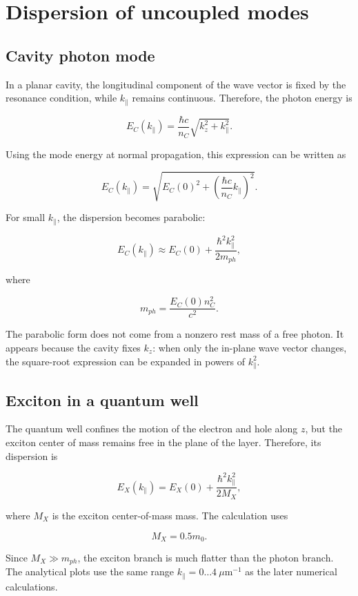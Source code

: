 \documentclass[12pt,a4paper]{article}
\begin{document}
\clearpage
\section{Dispersion of uncoupled modes}

\subsection{Cavity photon mode}

In a planar cavity, the longitudinal component of the wave vector is fixed by the resonance condition, while $k_\parallel$ remains continuous. Therefore, the photon energy is

\[
E_C(k_\parallel)
=
\frac{\hbar c}{n_C}
\sqrt{k_z^2+k_\parallel^2}.
\]

Using the mode energy at normal propagation, this expression can be written as

\[
E_C(k_\parallel)
=
\sqrt{
E_C(0)^2+
\left(\frac{\hbar c}{n_C}k_\parallel\right)^2
}.
\]

For small $k_\parallel$, the dispersion becomes parabolic:

\[
E_C(k_\parallel)
\approx
E_C(0)+\frac{\hbar^2k_\parallel^2}{2m_{ph}},
\]

where

\[
m_{ph}=\frac{E_C(0)n_C^2}{c^2}.
\]

The parabolic form does not come from a nonzero rest mass of a free photon. It appears because the cavity fixes $k_z$: when only the in-plane wave vector changes, the square-root expression can be expanded in powers of $k_\parallel^2$.

\subsection{Exciton in a quantum well}

The quantum well confines the motion of the electron and hole along $z$, but the exciton center of mass remains free in the plane of the layer. Therefore, its dispersion is

\[
E_X(k_\parallel)
=
E_X(0)+\frac{\hbar^2k_\parallel^2}{2M_X},
\]

where $M_X$ is the exciton center-of-mass mass. The calculation uses

\[
M_X=0.5m_0.
\]

Since $M_X\gg m_{ph}$, the exciton branch is much flatter than the photon branch. The analytical plots use the same range $k_\parallel=0\ldots4\ \mu\mathrm m^{-1}$ as the later numerical calculations.
\end{document}
